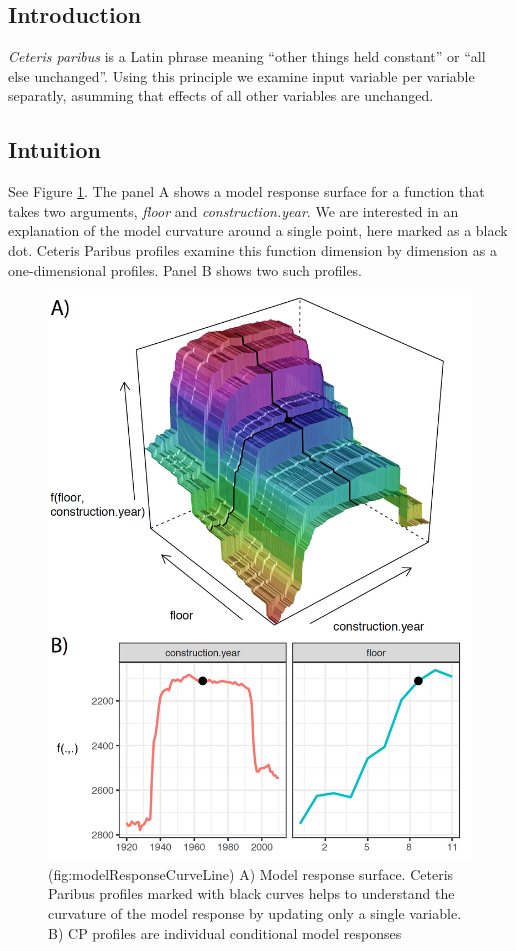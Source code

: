 \documentclass[]{krantz}
\theoremstyle{definition}
\theoremstyle{definition}
\theoremstyle{definition}
\theoremstyle{remark}
\begin{document}
\hypertarget{introduction-1}{%
\subsection{Introduction}\label{introduction-1}}

\emph{Ceteris paribus} is a Latin phrase meaning ``other things held
constant'' or ``all else unchanged''. Using this principle we examine
input variable per variable separatly, asumming that effects of all
other variables are unchanged.

\hypertarget{intuition}{%
\subsection{Intuition}\label{intuition}}

See Figure \ref{fig:modelResponseCurveLine}. The panel A shows a model
response surface for a function that takes two arguments, \emph{floor}
and \emph{construction.year}. We are interested in an explanation of the
model curvature around a single point, here marked as a black dot.
Ceteris Paribus profiles examine this function dimension by dimension as
a one-dimensional profiles. Panel B shows two such profiles.

\begin{figure}

{\centering \includegraphics[width=0.7\linewidth]{figure/model_response_line} 

}

\caption{(fig:modelResponseCurveLine) A) Model response surface. Ceteris Paribus profiles marked with black curves helps to understand the curvature of the model response by updating only a single variable. B) CP profiles are individual conditional model responses}\label{fig:modelResponseCurveLine}
\end{figure}
\end{document}
